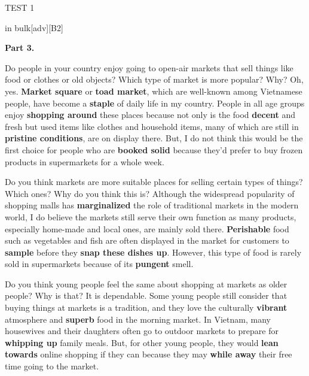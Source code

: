 \begin{glossarymc}[Cambridge 9]
\begin{test}{TEST 1}
\begin{VocabExplain}[Part 2]
            \begin{ExplainCard}{in bulk}[adv][B2]
            \end{ExplainCard}
        \end{VocabExplain}

    \noindent
    \textbf{Part 3.}
    \begin{qa}{Do people in your country enjoy going to open-air markets that sell things like food or clothes or old objects? Which type of market is more popular? Why?}
    Oh, yes. \textbf{Market square} or \textbf{toad market}, which are well-known among Vietnamese people, have become a \textbf{staple} of daily life in my country. People in all age groups enjoy \textbf{shopping around} these places because not only is the food \textbf{decent} and fresh but used items like clothes and household items, many of which are still in \textbf{pristine conditions}, are on display there. But, I do not think this would be the first choice for people who are \textbf{booked solid} because they'd prefer to buy frozen products in supermarkets for a whole week.
    \end{qa}

    \begin{qa}{Do you think markets are more suitable places for selling certain types of things? Which ones? Why do you think this is?}
    Although the widespread popularity of shopping malls has \textbf{marginalized} the role of traditional markets in the modern world, I do believe the markets still serve their own function as many products, especially home-made and local ones, are mainly sold there. \textbf{Perishable} food such as vegetables and fish are often displayed in the market for customers to \textbf{sample} before they \textbf{snap these dishes up}. However, this type of food is rarely sold in supermarkets because of its \textbf{pungent} smell.
    \end{qa}

    \begin{qa}{Do you think young people feel the same about shopping at markets as older people? Why is that?}
    It is dependable. Some young people still consider that buying things at markets is a tradition, and they love the culturally \textbf{vibrant} atmosphere and \textbf{superb} food in the morning market. In Vietnam, many housewives and their daughters often go to outdoor markets to prepare for \textbf{whipping up} family meals. But, for other young people, they would \textbf{lean towards} online shopping if they can because they may \textbf{while away} their free time going to the market.
    \end{qa}


\end{test}
\end{glossarymc}
